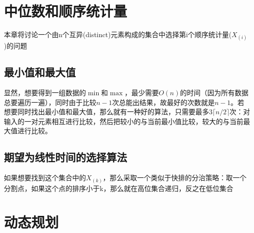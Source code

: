 \documentclass[]{report}
\begin{document}
	\chapter{中位数和顺序统计量}
		本章将讨论一个由n个互异(distinct)元素构成的集合中选择第i个顺序统计量($X_{(i)}$)的问题
	\section{最小值和最大值}
		显然，想要得到一组数据的$\min$和$\max$，最少需要$O(n)$的时间（因为所有数据总要遍历一遍），同时由于比较$n-1$次总能出结果，故最好的次数就是$n-1$。若想要同时找出最小值和最大值，那么就有一种好的算法，只需要最多$3\lceil n/2\rceil$次：对输入的一对元素相互进行比较，然后把较小的与当前最小值比较，较大的与当前最大值进行比较。
	\section{期望为线性时间的选择算法}
		如果想要找到这个集合中的$X_{(k)}$，那么采取一个类似于快排的分治策略：取一个分割点，如果这个点的排序小于k，那么就在高位集合递归，反之在低位集合




	\chapter{动态规划}
\end{document}

